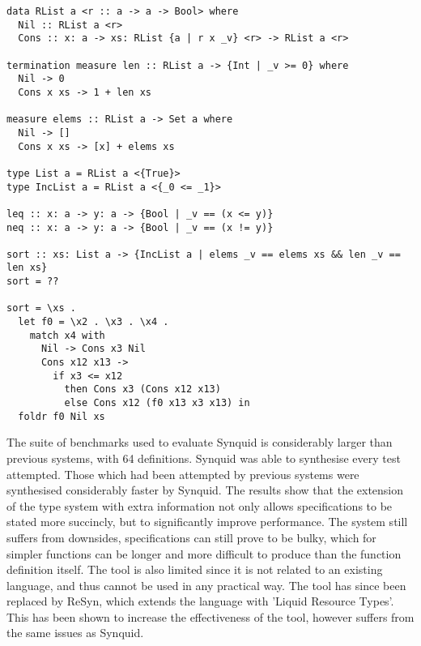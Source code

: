 \documentclass[a4paper]{article}
\begin{document}
\begin{center}
\begin{verbatim}
data RList a <r :: a -> a -> Bool> where
  Nil :: RList a <r>
  Cons :: x: a -> xs: RList {a | r x _v} <r> -> RList a <r>

termination measure len :: RList a -> {Int | _v >= 0} where
  Nil -> 0
  Cons x xs -> 1 + len xs  

measure elems :: RList a -> Set a where
  Nil -> []
  Cons x xs -> [x] + elems xs  

type List a = RList a <{True}>
type IncList a = RList a <{_0 <= _1}>  

leq :: x: a -> y: a -> {Bool | _v == (x <= y)}
neq :: x: a -> y: a -> {Bool | _v == (x != y)} 

sort :: xs: List a -> {IncList a | elems _v == elems xs && len _v == len xs}
sort = ??

sort = \xs .
  let f0 = \x2 . \x3 . \x4 .
	match x4 with
	  Nil -> Cons x3 Nil
	  Cons x12 x13 ->
		if x3 <= x12
		  then Cons x3 (Cons x12 x13)
		  else Cons x12 (f0 x13 x3 x13) in
  foldr f0 Nil xs
\end{verbatim}
\end{center}

The suite of benchmarks used to evaluate Synquid is considerably larger than previous systems, with 64 definitions.
Synquid was able to synthesise every test attempted. Those which had been attempted by previous systems were synthesised 
considerably faster by Synquid. The results show that the extension of the type system with extra information not only allows
specifications to be stated more succincly, but to significantly improve performance. The system still suffers from downsides, 
specifications can still prove to be bulky, which for simpler functions can be longer and more difficult to produce than the 
function definition itself. The tool is also limited since it is not related to an existing language, and thus cannot be used in
any practical way. The tool has since been replaced by ReSyn, which extends the language with 'Liquid Resource Types'. This has
been shown to increase the effectiveness of the tool, however suffers from the same issues as Synquid.
\end{document}
